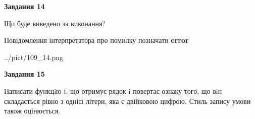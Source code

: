 \documentclass[11pt, ukrainian]{article}
\begin{document}
{\begin {large}
{\begin {center}\textbf{Завдання 14}\end {center}}\par
Що буде виведено за виконання? \par
Повідомлення інтерпретатора про помилку позначати \textbf{error}

\begin{center}
	{../pict/109_14.png}
\end{center}
\newpage

{\begin {center}\textbf{Завдання 15}\end {center}}\par

Написати функцiю f, що отримує рядок i повертає ознаку того, що вiн складається рівно з однієї літери, яка є двійковою цифрою. Стиль запису умови також оцінюється.\par
\newpage

\end {large}}
\end{document}
